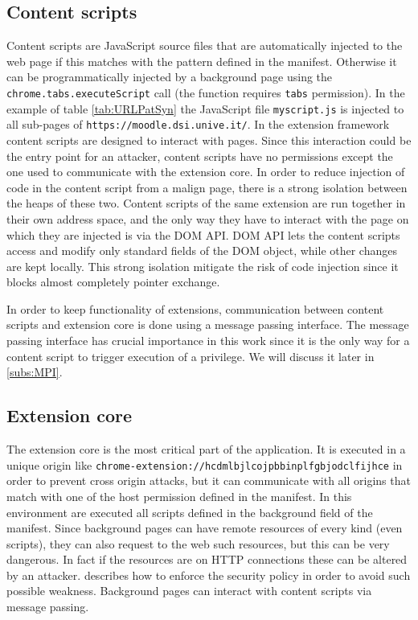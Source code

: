 \subsection{Content scripts}
Content scripts are JavaScript source files that are automatically injected to the web page if this matches with the pattern defined in the manifest. Otherwise it can be programmatically injected by a background page using the \texttt{chrome.tabs.executeScript} call (the function requires \texttt{tabs} permission). In the example of table \ref{tab:URLPatSyn} the JavaScript file \texttt{myscript.js} is injected to all sub-pages of \texttt{https://moodle.dsi.unive.it/}. In the extension framework content scripts are designed to interact with pages. Since this interaction could be the entry point for an attacker, content scripts have no permissions except the one used to communicate with the extension core. In order to reduce injection of code in the content script from a malign page, there is a strong isolation between the heaps of these two. Content scripts of the same extension are run together in their own address space, and the only way they have to interact with the page on which they are injected is via the DOM API. DOM API lets the content scripts access and modify only standard fields of the DOM object, while other changes are kept locally\cite{ChromeExtSpec}. This strong isolation mitigate the risk of code injection since it blocks almost completely pointer exchange. 

In order to keep functionality of extensions, communication between content scripts and extension core is done using a message passing interface. The message passing interface has crucial importance in this work since it is the only way for a content script to trigger execution of a privilege. We will discuss it later in \ref{subs:MPI}.

\subsection{Extension core}
The extension core is the most critical part of the application. It is executed in a unique origin like \texttt{chrome-extension://hcdmlbjlcojpbbinplfgbjodclfijhce} in order to prevent cross origin attacks, but it can communicate with all origins that match with one of the host permission defined in the manifest. In this environment are executed all scripts defined in the background field of the manifest. Since background pages can have remote resources of every kind (even scripts), they can also request to the web such resources, but this can be very dangerous. In fact if the resources are on HTTP connections these can be altered by an attacker. \cite{ChromeExtSpecSnd} describes how to enforce the security policy in order to avoid such possible weakness. Background pages can interact with content scripts via message passing.

